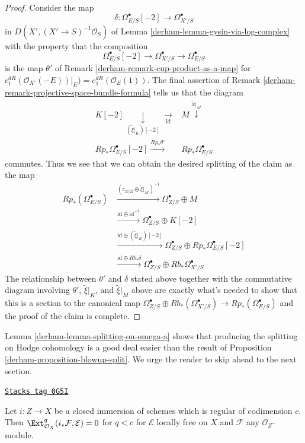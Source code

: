 \begin{proof}
\medskip\noindent
Consider the map
$$
\delta : \Omega^\bullet_{E/S}[-2] \longrightarrow \Omega^\bullet_{X'/S}
$$
in $D(X', (X' \to S)^{-1}\mathcal{O}_S)$ of
Lemma \ref{derham-lemma-gysin-via-log-complex}
with the property that the composition
$$
\Omega^\bullet_{E/S}[-2] \longrightarrow \Omega^\bullet_{X'/S}
\longrightarrow
\Omega^\bullet_{E/S}
$$
is the map $\theta'$ of Remark \ref{derham-remark-cup-product-as-a-map} for
$c_1^{dR}(\mathcal{O}_{X'}(-E))|_E) = c_1^{dR}(\mathcal{O}_E(1))$.
The final assertion of Remark \ref{derham-remark-projective-space-bundle-formula}
tells us that the diagram
$$
\begin{array}{cc}K[-2] \underset{(\tilde \xi|_K)[-2]}{\downarrow}\underset{\text{id}}{\longrightarrow} & M \overset{\tilde x|_M}{\downarrow} \\ Rp_*\Omega^\bullet_{E/S}[-2] \overset{Rp_*\theta'}{\longrightarrow} & Rp_*\Omega^\bullet_{E/S}\end{array}
$$
commutes. Thus we see that we can obtain the desired splitting of
the claim as the map
\begin{align*}
Rp_*(\Omega^\bullet_{E/S})
& \xrightarrow{(c_{E/Z} \oplus \tilde \xi|_M)^{-1}}
\Omega^\bullet_{Z/S} \oplus M \\
& \xrightarrow{\text{id} \oplus \text{id}^{-1}}
\Omega^\bullet_{Z/S} \oplus K[-2] \\
& \xrightarrow{\text{id} \oplus (\tilde \xi|_K)[-2]}
\Omega^\bullet_{Z/S} \oplus Rp_*\Omega^\bullet_{E/S}[-2] \\
& \xrightarrow{\text{id} \oplus Rb_*\delta}
\Omega^\bullet_{Z/S} \oplus Rb_*\Omega^\bullet_{X'/S}
\end{align*}
The relationship between $\theta'$ and $\delta$ stated above
together with the commutative diagram involving $\theta'$, $\tilde \xi|_K$,
and $\tilde \xi|_M$ above are exactly what's needed to
show that this is a section to the canonical map
$\Omega^\bullet_{Z/S} \oplus Rb_*(\Omega^\bullet_{X'/S}) \to
Rp_*(\Omega^\bullet_{E/S})$ and the proof of the claim is complete.
\end{proof}

Lemma \ref{derham-lemma-splitting-on-omega-a}
shows that producing the splitting on Hodge
cohomology is a good deal easier than the result of
Proposition \ref{derham-proposition-blowup-split}.
We urge the reader to skip ahead to the next section.

\begin{lemma}
\label{derham-lemma-ext-zero}
\href{https://stacks.math.columbia.edu/tag/0G5I}{\texttt{Stacks tag 0G5I}}

Let $i : Z \to X$ be a closed immersion of schemes which is regular of
codimension $c$. Then $\Ext^q_{\mathcal{O}_X}(i_*\mathcal{F}, \mathcal{E}) = 0$
for $q < c$ for $\mathcal{E}$ locally free on $X$ and $\mathcal{F}$
any $\mathcal{O}_Z$-module.
\end{lemma}

